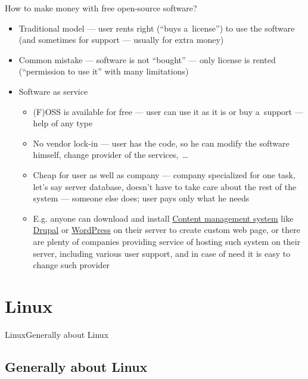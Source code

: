 \documentclass[compress, xelatex, 11pt, xcolor=svgnames, aspectratio=169, url={hyphens, lowtilde}]{beamer}
\begin{document}
\begin{frame}{How to make money with free open-source software?}
	\begin{itemize}
		\item Traditional model --- user rents right (\enquote{buys a~license}) to use the software (and sometimes for support --- usually for extra money)
		\item Common mistake --- software is not \enquote{bought} --- only license is rented (\enquote{permission to use it} with many limitations)
		\item Software as service
		\begin{itemize}
			\item (F)OSS is available for free --- user can use it as it is or buy a~support --- help of any type
			\item No vendor lock-in --- user has the code, so he can modify the software himself, change provider of the services,~\ldots
			\item Cheap for user as well as company --- company specialized for one task, let's say server database, doesn't have to take care about the rest of the system --- someone else does; user pays only what he needs
			\item E.g. anyone can download and install \href{https://en.wikipedia.org/wiki/Content_management_system}{Content management system} like \href{https://www.drupal.org/}{Drupal} or \href{https://wordpress.org/}{WordPress} on their server to create custom web page, or there are plenty of companies providing service of hosting such system on their server, including various user support, and in case of need it is easy to change such provider
		\end{itemize}
	\end{itemize}
\end{frame}

\section{Linux}

\begin{frame}{Linux}{Generally about Linux}
	\tableofcontents[currentsection, sectionstyle=show/hide, hideothersubsections]
\end{frame}

\subsection{Generally about Linux}
\end{document}
